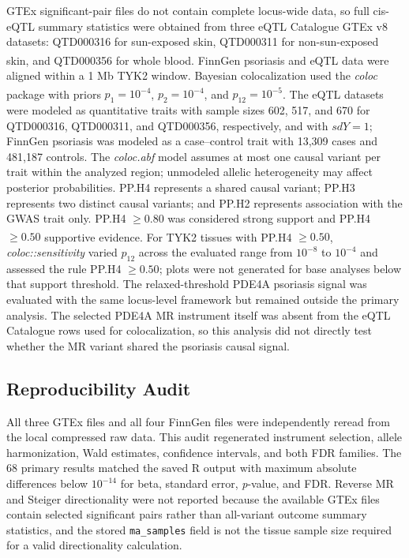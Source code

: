 GTEx significant-pair files do not contain complete locus-wide data, so full cis-eQTL summary statistics were obtained from three eQTL Catalogue GTEx v8 datasets: QTD000316 for sun-exposed skin, QTD000311 for non-sun-exposed skin, and QTD000356 for whole blood.\textsuperscript{\cite{kerimov2021eqtlcatalogue}} FinnGen psoriasis and eQTL data were aligned within a 1 Mb TYK2 window. Bayesian colocalization used the \textit{coloc} package with priors $p_1=10^{-4}$, $p_2=10^{-4}$, and $p_{12}=10^{-5}$.\textsuperscript{\cite{giambartolomei2014coloc}} The eQTL datasets were modeled as quantitative traits with sample sizes 602, 517, and 670 for QTD000316, QTD000311, and QTD000356, respectively, and with $sdY=1$; FinnGen psoriasis was modeled as a case--control trait with 13,309 cases and 481,187 controls. The \textit{coloc.abf} model assumes at most one causal variant per trait within the analyzed region; unmodeled allelic heterogeneity may affect posterior probabilities. PP.H4 represents a shared causal variant; PP.H3 represents two distinct causal variants; and PP.H2 represents association with the GWAS trait only. PP.H4 $\geq0.80$ was considered strong support and PP.H4 $\geq0.50$ supportive evidence.\textsuperscript{\cite{zuber2022coloc}} For TYK2 tissues with PP.H4 $\geq0.50$, \textit{coloc::sensitivity} varied $p_{12}$ across the evaluated range from $10^{-8}$ to $10^{-4}$ and assessed the rule PP.H4 $\geq0.50$; plots were not generated for base analyses below that support threshold. The relaxed-threshold PDE4A psoriasis signal was evaluated with the same locus-level framework but remained outside the primary analysis. The selected PDE4A MR instrument itself was absent from the eQTL Catalogue rows used for colocalization, so this analysis did not directly test whether the MR variant shared the psoriasis causal signal.

\subsection*{Reproducibility Audit}

All three GTEx files and all four FinnGen files were independently reread from the local compressed raw data. This audit regenerated instrument selection, allele harmonization, Wald estimates, confidence intervals, and both FDR families. The 68 primary results matched the saved R output with maximum absolute differences below $10^{-14}$ for beta, standard error, \textit{p}-value, and FDR. Reverse MR and Steiger directionality were not reported because the available GTEx files contain selected significant pairs rather than all-variant outcome summary statistics, and the stored \texttt{ma\_samples} field is not the tissue sample size required for a valid directionality calculation.
